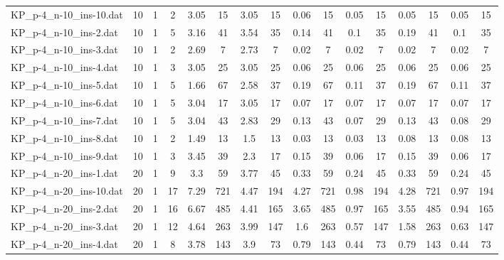 \begin{sidewaystable}[!ht]
{\begin{tabular}{lccccccccccccccc}
KP\_p-4\_n-10\_ins-10.dat & 10 & 1 & 2 & 3.05 & 15 & 3.05 & 15 & 0.06 & 15 &  \textcolor{blue2}{0.05} & 15 &  \textcolor{blue2}{0.05} & 15 &  \textcolor{blue2}{0.05} & 15 \\
KP\_p-4\_n-10\_ins-2.dat & 10 & 1 & 5 & 3.16 & 41 & 3.54 & 35 & 0.14 & 41 &  \textcolor{blue2}{0.1} & 35 & 0.19 & 41 &  \textcolor{blue2}{0.1} & 35 \\
KP\_p-4\_n-10\_ins-3.dat & 10 & 1 & 2 & 2.69 & 7 & 2.73 & 7 &  \textcolor{blue2}{0.02} & 7 &  \textcolor{blue2}{0.02} & 7 &  \textcolor{blue2}{0.02} & 7 &  \textcolor{blue2}{0.02} & 7 \\
KP\_p-4\_n-10\_ins-4.dat & 10 & 1 & 3 & 3.05 & 25 & 3.05 & 25 &  \textcolor{blue2}{0.06} & 25 &  \textcolor{blue2}{0.06} & 25 &  \textcolor{blue2}{0.06} & 25 &  \textcolor{blue2}{0.06} & 25 \\
KP\_p-4\_n-10\_ins-5.dat & 10 & 1 & 5 & 1.66 & 67 & 2.58 & 37 & 0.19 & 67 &  \textcolor{blue2}{0.11} & 37 & 0.19 & 67 &  \textcolor{blue2}{0.11} & 37 \\
KP\_p-4\_n-10\_ins-6.dat & 10 & 1 & 5 & 3.04 & 17 & 3.05 & 17 &  \textcolor{blue2}{0.07} & 17 &  \textcolor{blue2}{0.07} & 17 &  \textcolor{blue2}{0.07} & 17 &  \textcolor{blue2}{0.07} & 17 \\
KP\_p-4\_n-10\_ins-7.dat & 10 & 1 & 5 & 3.04 & 43 & 2.83 & 29 & 0.13 & 43 &  \textcolor{blue2}{0.07} & 29 & 0.13 & 43 & 0.08 & 29 \\
KP\_p-4\_n-10\_ins-8.dat & 10 & 1 & 2 & 1.49 & 13 & 1.5 & 13 &  \textcolor{blue2}{0.03} & 13 &  \textcolor{blue2}{0.03} & 13 & 0.08 & 13 & 0.08 & 13 \\
KP\_p-4\_n-10\_ins-9.dat & 10 & 1 & 3 & 3.45 & 39 & 2.3 & 17 & 0.15 & 39 &  \textcolor{blue2}{0.06} & 17 & 0.15 & 39 &  \textcolor{blue2}{0.06} & 17 \\
KP\_p-4\_n-20\_ins-1.dat & 20 & 1 & 9 & 3.3 & 59 & 3.77 & 45 & 0.33 & 59 &  \textcolor{blue2}{0.24} & 45 & 0.33 & 59 &  \textcolor{blue2}{0.24} & 45 \\
KP\_p-4\_n-20\_ins-10.dat & 20 & 1 & 17 & 7.29 & 721 & 4.47 & 194 & 4.27 & 721 & 0.98 & 194 & 4.28 & 721 & 0.97 & 194 \\
KP\_p-4\_n-20\_ins-2.dat & 20 & 1 & 16 & 6.67 & 485 & 4.41 & 165 & 3.65 & 485 & 0.97 & 165 & 3.55 & 485 &  \textcolor{blue2}{0.94} & 165 \\
KP\_p-4\_n-20\_ins-3.dat & 20 & 1 & 12 & 4.64 & 263 & 3.99 & 147 & 1.6 & 263 &  \textcolor{blue2}{0.57} & 147 & 1.58 & 263 & 0.63 & 147 \\
KP\_p-4\_n-20\_ins-4.dat & 20 & 1 & 8 & 3.78 & 143 & 3.9 & 73 & 0.79 & 143 &  \textcolor{blue2}{0.44} & 73 & 0.79 & 143 &  \textcolor{blue2}{0.44} & 73 \\

\end{tabular}}
\end{sidewaystable}
